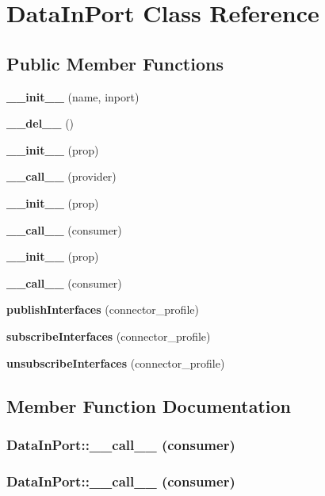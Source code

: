 \section{Data\-In\-Port Class Reference}
\label{classDataInPort}
\subsection*{Public Member Functions}
\begin{CompactItemize}
\item 
{\bf \_\-\_\-init\_\-\_\-} (name, inport)
\item 
{\bf \_\-\_\-del\_\-\_\-} ()
\item 
{\bf \_\-\_\-init\_\-\_\-} (prop)
\item 
{\bf \_\-\_\-call\_\-\_\-} (provider)
\item 
{\bf \_\-\_\-init\_\-\_\-} (prop)
\item 
{\bf \_\-\_\-call\_\-\_\-} (consumer)
\item 
{\bf \_\-\_\-init\_\-\_\-} (prop)
\item 
{\bf \_\-\_\-call\_\-\_\-} (consumer)
\item 
{\bf publish\-Interfaces} (connector\_\-profile)
\item 
{\bf subscribe\-Interfaces} (connector\_\-profile)
\item 
{\bf unsubscribe\-Interfaces} (connector\_\-profile)
\end{CompactItemize}


\subsection{Member Function Documentation}
\subsubsection{\setlength{\rightskip}{0pt plus 5cm}Data\-In\-Port::\_\-\_\-call\_\-\_\- (consumer)}\label{classDataInPort_DataInPorta7}


\subsubsection{\setlength{\rightskip}{0pt plus 5cm}Data\-In\-Port::\_\-\_\-call\_\-\_\- (consumer)}\label{classDataInPort_DataInPorta5}


